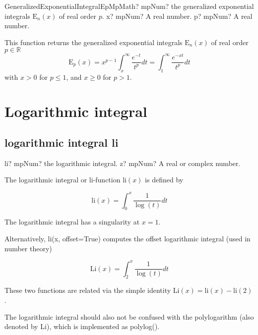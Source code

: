 \begin{mpFunctionsExtract}
	\mpFunctionTwoNotImplemented
	{GeneralizedExponentialIntegralEpMpMath? mpNum? the generalized exponential integrals $\text{E}_n(x)$ of real order $p$.}
	{x? mpNum? A real number.}
	{p? mpNum? A real number.}
\end{mpFunctionsExtract}

\vspace{0.3cm}
This function returns the generalized exponential integrals $\text{E}_n(x)$ of real order $p \in  \mathbb{R}$
\begin{equation}
	\text{E}_p(x) = x^{p-1} \int_{x}^{\infty} \frac{e^{-t}}{t^p} dt = \int_{1}^{\infty} \frac{e^{-xt}}{t^p} dt
\end{equation}
with $x>0$ for $p \leq 1$, and $x \geq 0$ for $p>1$. 




\newpage
\section{Logarithmic integral}

\subsection{logarithmic integral li}

\begin{mpFunctionsExtract}
	\mpFunctionOne
	{li? mpNum? the logarithmic integral.}
	{z? mpNum? A real or complex number.}
\end{mpFunctionsExtract}

\vpara
The logarithmic integral or li-function $\text{li}(x)$ is defined by

\begin{equation}
\text{li}(x)= \int_0^x \frac{1}{\log(t)} dt
\end{equation}

The logarithmic integral has a singularity at $x=1$.

Alternatively, li(x, offset=True) computes the offset logarithmic integral (used in number theory)

\begin{equation}
\text{Li}(x)= \int_2^x \frac{1}{\log(t)} dt
\end{equation}


These two functions are related via the simple identity $\text{Li}(x)=\text{li}(x)-\text{li}(2)$.

The logarithmic integral should also not be confused with the polylogarithm (also denoted by Li), which is implemented as polylog().

